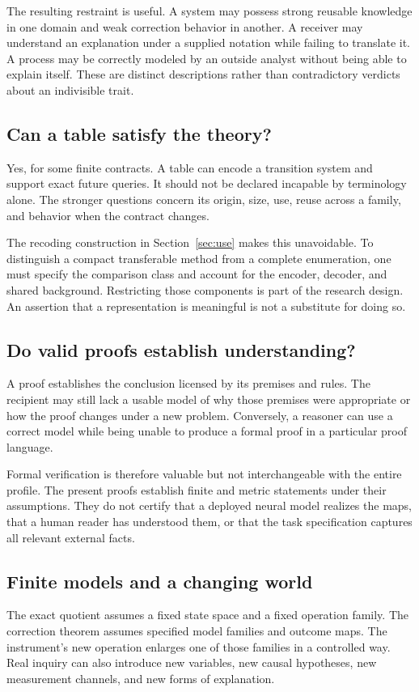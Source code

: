 \documentclass[11pt,letterpaper]{article}
\theoremstyle{plain}
\theoremstyle{definition}
\begin{document}
The resulting restraint is useful. A system may possess strong reusable knowledge in one domain and weak correction behavior in another. A receiver may understand an explanation under a supplied notation while failing to translate it. A process may be correctly modeled by an outside analyst without being able to explain itself. These are distinct descriptions rather than contradictory verdicts about an indivisible trait.

\subsection{Can a table satisfy the theory?}
Yes, for some finite contracts. A table can encode a transition system and support exact future queries. It should not be declared incapable by terminology alone. The stronger questions concern its origin, size, use, reuse across a family, and behavior when the contract changes.

The recoding construction in Section~\ref{sec:use} makes this unavoidable. To distinguish a compact transferable method from a complete enumeration, one must specify the comparison class and account for the encoder, decoder, and shared background. Restricting those components is part of the research design. An assertion that a representation is meaningful is not a substitute for doing so.

\subsection{Do valid proofs establish understanding?}
A proof establishes the conclusion licensed by its premises and rules. The recipient may still lack a usable model of why those premises were appropriate or how the proof changes under a new problem. Conversely, a reasoner can use a correct model while being unable to produce a formal proof in a particular proof language.

Formal verification is therefore valuable but not interchangeable with the entire profile. The present proofs establish finite and metric statements under their assumptions. They do not certify that a deployed neural model realizes the maps, that a human reader has understood them, or that the task specification captures all relevant external facts.

\subsection{Finite models and a changing world}
The exact quotient assumes a fixed state space and a fixed operation family. The correction theorem assumes specified model families and outcome maps. The instrument's new operation enlarges one of those families in a controlled way. Real inquiry can also introduce new variables, new causal hypotheses, new measurement channels, and new forms of explanation.
\end{document}
